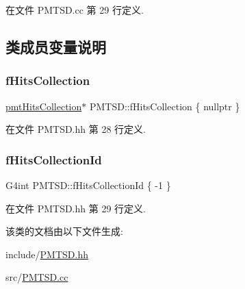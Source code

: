 在文件 P\+M\+T\+S\+D.\+cc 第 29 行定义.



\subsection{类成员变量说明}
\mbox{\label{classPMTSD_ad096abaafe714b508f14af1a2d3673b9}} 
\subsubsection{\texorpdfstring{f\+Hits\+Collection}{fHitsCollection}}
{\footnotesize\ttfamily \hyperlink{PMThit_8hh_a7f735d1ad0bfe8c6aa451ac6d58ffa57}{pmt\+Hits\+Collection}$\ast$ P\+M\+T\+S\+D\+::f\+Hits\+Collection \{ nullptr \}\hspace{0.3cm}{\ttfamily [private]}}



在文件 P\+M\+T\+S\+D.\+hh 第 28 行定义.

\mbox{\label{classPMTSD_a2b3736dfb006ce9ca639b5008c91e6a5}} 
\subsubsection{\texorpdfstring{f\+Hits\+Collection\+Id}{fHitsCollectionId}}
{\footnotesize\ttfamily G4int P\+M\+T\+S\+D\+::f\+Hits\+Collection\+Id \{ -\/1 \}\hspace{0.3cm}{\ttfamily [private]}}



在文件 P\+M\+T\+S\+D.\+hh 第 29 行定义.



该类的文档由以下文件生成\+:\begin{DoxyCompactItemize}
\item 
include/\hyperlink{PMTSD_8hh}{P\+M\+T\+S\+D.\+hh}\item 
src/\hyperlink{PMTSD_8cc}{P\+M\+T\+S\+D.\+cc}\end{DoxyCompactItemize}
